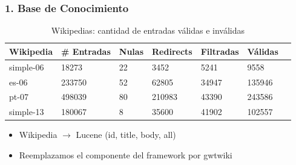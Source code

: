\begin{frame}
\frametitle{1. Base de Conocimiento}
    \begin{table}
    \centering
    \begin{center}
    \begin{tabular}{| l | l | l | l | l | l| l|}
    \hline
    Wikipedia & \# Entradas & Nulas & Redirects & Filtradas & Válidas \\ \hline 
    simple-06 & 18273 & 22 &  3452 & 5241 & 9558  \\ \hline
    es-06 & 233750 & 52 & 62805 & 34947 & 135946 \\ \hline
    pt-07 & 498039 & 80 & 210983 & 43390 & 243586 \\ \hline
    simple-13 & 180067 & 8 & 35600 & 41902 & 102557\\ \hline
    \end{tabular}
    \caption{Wikipedias: cantidad de entradas válidas e inválidas}
    \label{table:creacion-indices}
    \end{center}
    \end{table}
    \begin{itemize}
      \item Wikipedia $\rightarrow$ Lucene (id, title, body, all)
      \item Reemplazamos el componente del framework por gwtwiki
    \end{itemize}
\end{frame}

